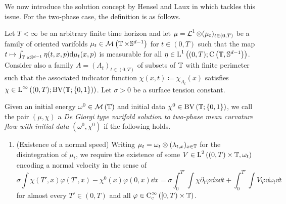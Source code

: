 We now introduce the solution concept by Hensel and Laux in 
\cite{hensel_laux_varifold_solution_concept_for_mean_curvature_flow} which 
tackles this issue. 
For the two-phase case, the definition is as follows.

\begin{definition}
	\label{de_giorgi_varifold_solution_for_mcf}
	Let $ T < \infty $ be an arbitrary finite time horizon and let $ \mu = 
	\operatorname{\mathcal{L}}^{ 1 } \otimes ( \mu_{ t } )_{ t \in ( 0 , T ) } $ be a 
	family of oriented varifolds $ \mu_{ t } \in \mathcal{ M } \left( 
	\operatorname{\mathbb{T}} \times \mathbb{ S }^{ d - 1 } \right) $ for $ t \in ( 0 , T ) 
	$ such that the map $ t \mapsto \int_{ \operatorname{\mathbb{T}} \times \mathbb{ S }^{ d 
			-1 } } \eta (t, x , p ) \dd \mu_{ t } ( x , p ) $ is measurable 
			for all 
	$ \eta \in \operatorname{L}^{ 1 } \left( ( 0 , T ) ; \operatorname{C} \left( \operatorname{\mathbb{T}}, 
	\mathbb{ S 
	}^{ d - 1 } \right) \right) $. 
	Consider also a family $ A = ( A_{ t } )_{ t \in ( 0 , T ) } $ of 
	subsets of $ \operatorname{\mathbb{T}} $ with finite perimeter such that the associated 
	indicator function $ \chi ( x , t ) \coloneqq \chi_{ A _{ t } } ( x ) $ 
	satisfies 
	$ \chi \in \operatorname{L}^{ \infty } \left( ( 0 , T ) ; \operatorname{BV} ( \operatorname{\mathbb{T}} ; \{ 0 , 
	1 \} ) \right) $.
	Let $ \sigma > 0 $ be a surface tension constant.
	
	Given an initial energy
	$ \omega^{ 0 } \in \mathcal{ M } \left( \operatorname{\mathbb{T}} \right) $ and initial 
	data $ \chi^{ 0 } \in \operatorname{BV} 
	\left( \operatorname{\mathbb{T}} ; \{ 0 , 1 \} \right)$, we call the pair $ ( \mu , \chi ) 
	$ a \emph{De Giorgi type varifold solution to two-phase mean curvature 
	flow 
		with initial data} $ ( \omega^{ 0 } , \chi^{ 0 } ) $ if the following 
		holds.
	\begin{enumerate}
		\item (Existence of a normal speed)
		Writing $ \mu_{ t } = \omega_{ t } \otimes ( \lambda_{ t, x } )_{ x 
			\in \operatorname{\mathbb{T}}} $ for the disintegration of $ \mu_{ t } $, we 
			require 
		the existence of some 
		$ V \in \operatorname{L}^{ 2 } \left( ( 0 , T ) \times \operatorname{\mathbb{T}} ,
		\omega_{ t } \right) $ encoding a normal velocity in the sense of
		\begin{equation}
			\label{equation_varifold_velocity}
			\sigma
			\int
			\chi ( T' , x ) \varphi ( T' , x ) 
			-
			\chi^{ 0 } ( x ) \varphi (0,x)
			\dd{ x }
			=
			\sigma
			\int_{ 0 }^{ T' }
			\int
			\chi
			\partial_{ t } \varphi 
			\dd{ x }
			\dd{ t }
			+
			\int_{ 0 }^{ T' }
			\int
			V \varphi 
			\dd{ \omega_{ t } }
			\dd{ t }
		\end{equation}
		for almost every $ T' \in ( 0 , T ) $ and all $ \varphi \in \operatorname{C}_{ 
			\mathrm{c} }^{ \infty } \left( [ 0 , T ) \times \operatorname{\mathbb{T}} \right) 
		$.
		

\end{enumerate}
\end{definition}
